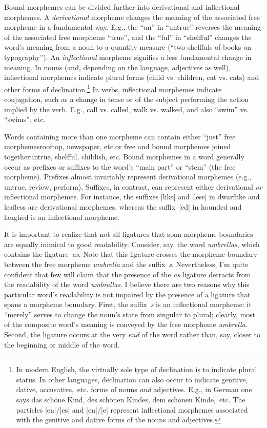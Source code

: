 \documentclass[11pt]{article}
\begin{document}
Bound morphemes can be divided further into derivational and inflectional morphemes. A \emph{derivational} morpheme changes the meaning of the associated free morpheme in a fundamental way. E.g., the \enquote{un} in \enquote{untrue} reverses the meaning of the associated free morpheme \enquote{true}, and the \enquote{ful} in \enquote{shelfful} changes the word's meaning from a noun to a quantity measure (\enquote{two shelffuls of books on typography}). 
An \emph{inflectional} morpheme signifies a less fundamental change in meaning. In nouns (and, depending on the language, adjectives as well), inflectional morphemes indicate plural forms (child vs. children, cat vs. cats) and other forms of declination.\footnote{In modern English, the virtually sole type of declination is to indicate plural status. In other languages, declination can also occur to indicate genitive, dative, accusative,~etc. forms of nouns \emph{and} adjectives. E.g., in German one says das schöne Kind, des schönen Kindes, dem schönen Kinde,~etc. The particles |en|/|es| and |en|/|e| represent inflectional morphemes associated with the genitive and dative forms of the nouns and adjectives.} In verbs, inflectional morphemes indicate conjugation, such as a change in tense or of the subject performing the action implied by the verb. E.g., call vs. called, walk vs. walked, and also \enquote{swim} vs. \enquote{swims}, etc. 

Words containing more than one morpheme can contain either \enquote{just} free morphemes\textemdash rooftop, newspaper, etc.\textemdash or free and bound morphemes joined together\textemdash untrue, shelfful, childish, etc. Bound morphemes in a word generally occur as prefixes or suffixes to the word's \enquote{main part} or \enquote{stem} (the free morpheme). Prefixes almost invariably represent derivational morphemes (e.g., untrue, review, perform). Suffixes, in contrast, can represent either derivational \emph{or} inflectional morphemes. For instance, the suffixes |like| and |less| in dwarflike and leafless are derivational morphemes, whereas the suffix~|ed| in hounded and laughed is an inflectional morpheme. 

It is important to realize that not all ligatures that span morpheme boundaries are equally inimical to good readability. Consider, say, the word \emph{umbrellas}, which contains the ligature~\emph{as}. Note that this ligature crosses the morpheme boundary between the free morpheme \emph{umbrella} and the suffix~\emph{s}. Nevertheless, I'm quite confident that few will claim that the presence of the \emph{as} ligature detracts from the readability of the word \emph{umbrellas}. I believe there are two reasons why this particular word's readability is not impaired by the presence of a ligature that spans a morpheme boundary. First, the suffix~\emph{s} is an inflectional morpheme: it \enquote{merely} serves to change the noun's state from singular to plural; clearly, most of the composite word's meaning is conveyed by the free morpheme \emph{umbrella}. Second, the ligature occurs at the very \emph{end} of the word rather than, say, closer to the beginning or middle of the word.
\end{document}
